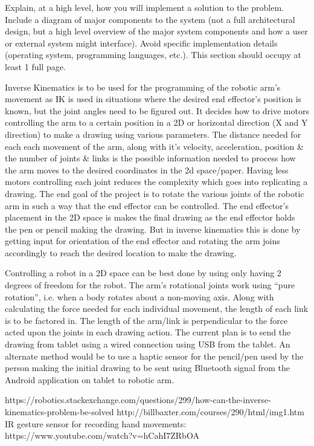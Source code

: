Explain, at a high level, how you will implement a solution to the problem. Include a diagram of major components
to the system (not a full architectural design, but a high level overview of the major system components and
how a user or external system might interface). Avoid specific implementation details (operating system, programming languages, etc.).
This section should occupy at least 1 full page.


Inverse Kinematics is to be used for the programming of the robotic arm’s movement as IK is used in situations where the desired end effector’s position is known, but the joint angles need to be figured out. It decides how to drive motors controlling the arm to a certain position in a 2D or horizontal direction (X and Y direction) to make a drawing using various parameters.
The distance needed for each each movement of the arm, along with it’s velocity, acceleration, position & the number of joints & links is the possible information needed to
process how the arm moves to the desired coordinates in the 2d space/paper. Having less motors controlling each joint reduces the complexity which goes into replicating a drawing.
The end goal of the project is to rotate the various joints of the robotic arm in such a way that the end effector can be controlled.
The end effector’s placement in the 2D space is makes the final drawing as the end effector holds the pen or pencil making the drawing.
But in inverse kinematics this is done by getting input for orientation of the end effector and rotating the arm joins accordingly to reach the desired location to make the drawing.


Controlling a robot in a 2D space can be best done by using only having 2 degrees of freedom for the robot. The arm’s rotational joints work using “pure rotation”, i.e.
when a body rotates about a non-moving axis. Along with calculating the force needed for each individual movement, the length of each link is to be factored in.
The length of the arm/link is perpendicular to the force acted upon the joints in each drawing action. The current plan is to send the drawing from tablet
using a wired connection using USB from the tablet. An alternate method would be to use a haptic sensor for the pencil/pen used by the person making the initial
drawing to be sent using Bluetooth signal  from the Android application on tablet to robotic arm. 

https://robotics.stackexchange.com/questions/299/how-can-the-inverse-kinematics-problem-be-solved
http://billbaxter.com/courses/290/html/img1.htm
IR gesture sensor for recording hand movements: 
https://www.youtube.com/watch?v=hCahI7ZRbOA
